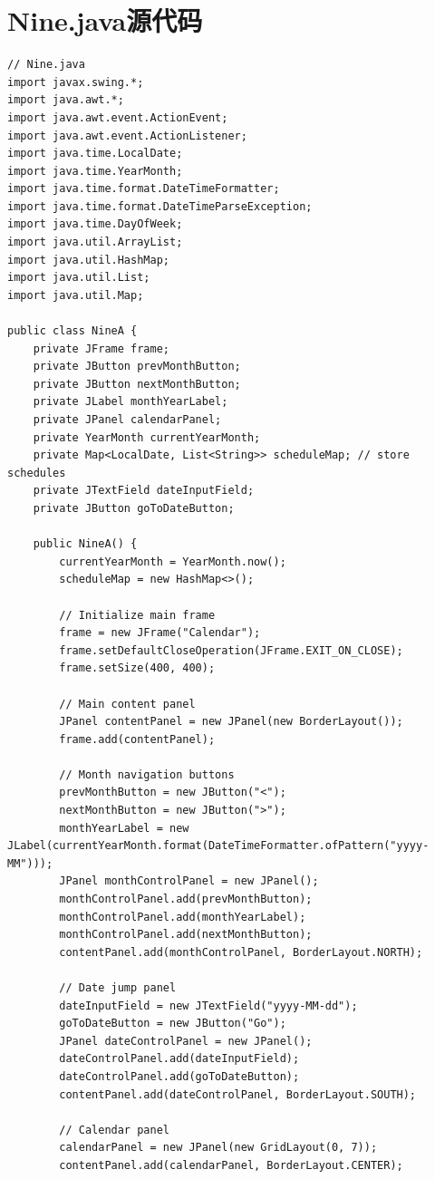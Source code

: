 \documentclass[12pt,a4paper]{article}
\begin{document}
\section*{Nine.java源代码}\label{sec:nine}
\begin{lstlisting}
// Nine.java
import javax.swing.*;
import java.awt.*;
import java.awt.event.ActionEvent;
import java.awt.event.ActionListener;
import java.time.LocalDate;
import java.time.YearMonth;
import java.time.format.DateTimeFormatter;
import java.time.format.DateTimeParseException;
import java.time.DayOfWeek;
import java.util.ArrayList;
import java.util.HashMap;
import java.util.List;
import java.util.Map;

public class NineA {
    private JFrame frame;
    private JButton prevMonthButton;
    private JButton nextMonthButton;
    private JLabel monthYearLabel;
    private JPanel calendarPanel;
    private YearMonth currentYearMonth;
    private Map<LocalDate, List<String>> scheduleMap; // store schedules
    private JTextField dateInputField;
    private JButton goToDateButton;

    public NineA() {
        currentYearMonth = YearMonth.now();
        scheduleMap = new HashMap<>();

        // Initialize main frame
        frame = new JFrame("Calendar");
        frame.setDefaultCloseOperation(JFrame.EXIT_ON_CLOSE);
        frame.setSize(400, 400);

        // Main content panel
        JPanel contentPanel = new JPanel(new BorderLayout());
        frame.add(contentPanel);

        // Month navigation buttons
        prevMonthButton = new JButton("<");
        nextMonthButton = new JButton(">");
        monthYearLabel = new JLabel(currentYearMonth.format(DateTimeFormatter.ofPattern("yyyy-MM")));
        JPanel monthControlPanel = new JPanel();
        monthControlPanel.add(prevMonthButton);
        monthControlPanel.add(monthYearLabel);
        monthControlPanel.add(nextMonthButton);
        contentPanel.add(monthControlPanel, BorderLayout.NORTH);

        // Date jump panel
        dateInputField = new JTextField("yyyy-MM-dd");
        goToDateButton = new JButton("Go");
        JPanel dateControlPanel = new JPanel();
        dateControlPanel.add(dateInputField);
        dateControlPanel.add(goToDateButton);
        contentPanel.add(dateControlPanel, BorderLayout.SOUTH);

        // Calendar panel
        calendarPanel = new JPanel(new GridLayout(0, 7));
        contentPanel.add(calendarPanel, BorderLayout.CENTER);


\end{lstlisting}
\end{document}
